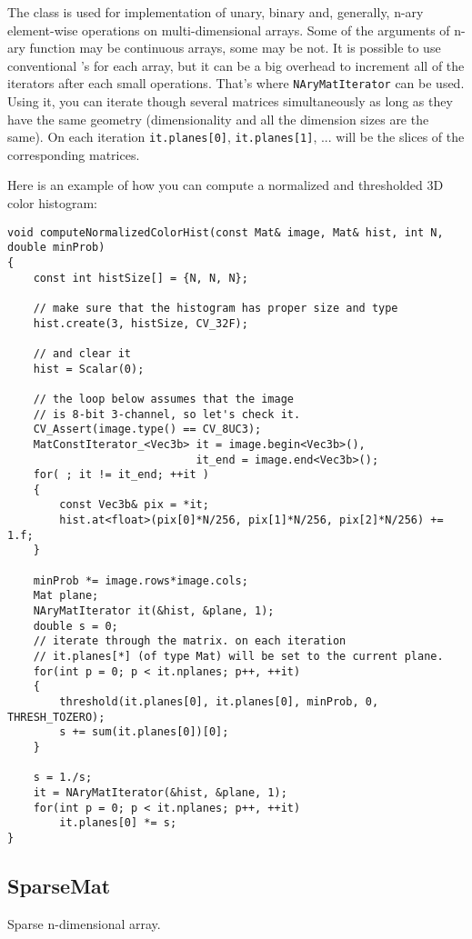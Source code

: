 The class is used for implementation of unary, binary and, generally, n-ary element-wise operations on multi-dimensional arrays. Some of the arguments of n-ary function may be continuous arrays, some may be not. It is possible to use conventional 's for each array, but it can be a big overhead to increment all of the iterators after each small operations. That's where \texttt{NAryMatIterator} can be used. Using it, you can iterate though several matrices simultaneously as long as they have the same geometry (dimensionality and all the dimension sizes are the same). On each iteration \texttt{it.planes[0]}, \texttt{it.planes[1]}, ... will be the slices of the corresponding matrices.

Here is an example of how you can compute a normalized and thresholded 3D color histogram:

\begin{lstlisting}
void computeNormalizedColorHist(const Mat& image, Mat& hist, int N, double minProb)
{
    const int histSize[] = {N, N, N};
    
    // make sure that the histogram has proper size and type
    hist.create(3, histSize, CV_32F);
    
    // and clear it
    hist = Scalar(0);
    
    // the loop below assumes that the image
    // is 8-bit 3-channel, so let's check it.
    CV_Assert(image.type() == CV_8UC3);
    MatConstIterator_<Vec3b> it = image.begin<Vec3b>(),
                             it_end = image.end<Vec3b>();    
    for( ; it != it_end; ++it )
    {
        const Vec3b& pix = *it;        
        hist.at<float>(pix[0]*N/256, pix[1]*N/256, pix[2]*N/256) += 1.f;
    }
    
    minProb *= image.rows*image.cols;
    Mat plane;
    NAryMatIterator it(&hist, &plane, 1);
    double s = 0;
    // iterate through the matrix. on each iteration
    // it.planes[*] (of type Mat) will be set to the current plane.
    for(int p = 0; p < it.nplanes; p++, ++it)
    {
        threshold(it.planes[0], it.planes[0], minProb, 0, THRESH_TOZERO);
        s += sum(it.planes[0])[0];
    }
    
    s = 1./s;
    it = NAryMatIterator(&hist, &plane, 1);
    for(int p = 0; p < it.nplanes; p++, ++it)
        it.planes[0] *= s;
}
\end{lstlisting}


\subsection{SparseMat}\label{SparseMat}
Sparse n-dimensional array.

